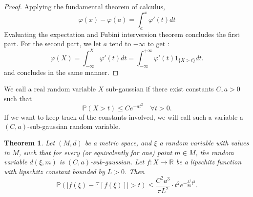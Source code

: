 \documentclass{article}
\newtheorem{theorem}{Theorem}
\begin{document}
\begin{proof}
Applying the fundamental theorem of calculus,
$$\varphi(x)-\varphi(a) = \int_a^x\varphi'(t)dt$$
Evaluating the expectation and Fubini interversion theorem concludes the first part.
For the second part, we let $a$ tend to $-\infty$ to get :
$$\varphi(X) = \int_{-\infty}^X\varphi'(t)dt = \int_{-\infty}^{+\infty} \varphi'(t) 1_{\{X > t\}} dt.$$
and concludes in the same manner.
\end{proof}

We call a real random variable $X$ sub-gaussian if there exist constants $C , a>0$ such that 
$$\mathbb P( X > t ) \leq Ce^{-at^2} \quad \forall t >0.$$ 
If we want to keep track of the constants involved, we will call such a variable a $(C,a)$-sub-gaussian random variable.

\begin{theorem}
Let $(M,d)$ be a metric space, and $\xi$ a random variable with values in $M$, such that for every (or equivalently for one) point $m\in M$, the random variable $d(\xi, m)$ is $(C,a)$-sub-gaussian. Let $f : X\rightarrow \mathbb R$ be a lipschitz function with lipschitz constant bounded by $L>0$. Then  
$$\mathbb P(|f(\xi)  - \mathbb E[f(\xi)]| > t) \leq   \frac{C^2a^3}{\pi L^2} \cdot t^2 e^{-\frac{ L^2}{8a}t^2} .$$
\end{theorem}
\end{document}

